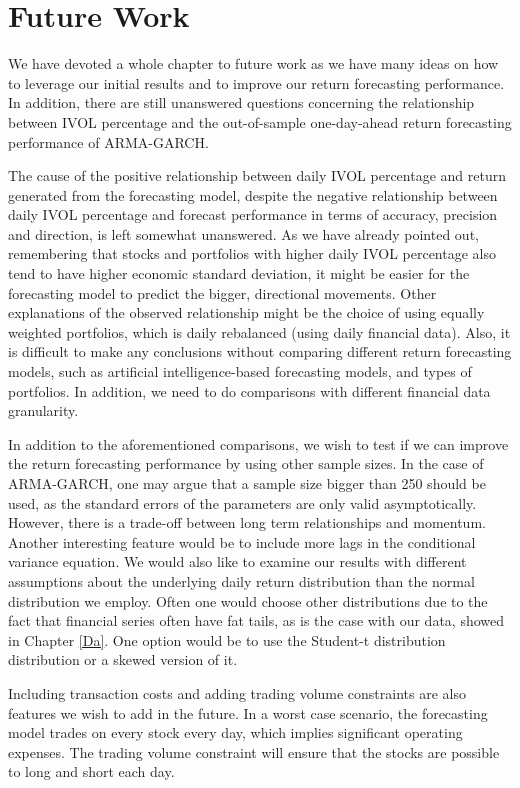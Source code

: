 \chapter{Future Work} \label{FutureWork}
\label{FW}
We have devoted a whole chapter to future work as we have many ideas on how to leverage our initial results and to improve our return forecasting performance. In addition, there are still unanswered questions concerning the relationship between IVOL percentage and the out-of-sample one-day-ahead return forecasting performance of ARMA-GARCH.

The cause of the positive relationship between daily IVOL percentage and return generated from the forecasting model, despite the negative relationship between daily IVOL percentage and forecast performance in terms of accuracy, precision and direction, is left somewhat unanswered. As we have already pointed out, remembering that stocks and portfolios with higher daily IVOL percentage also tend to have higher economic standard deviation, it might be easier for the forecasting model to predict the bigger, directional movements. Other explanations of the observed relationship might be the choice of using equally weighted portfolios, which is daily rebalanced (using daily financial data). Also, it is difficult to make any conclusions without comparing different return forecasting models, such as artificial intelligence-based forecasting models, and types of portfolios. In addition, we need to do comparisons with different financial data granularity.

In addition to the aforementioned comparisons, we wish to test if we can improve the return forecasting performance by using other sample sizes. In the case of ARMA-GARCH, one may argue that a sample size bigger than 250 should be used, as the standard errors of the parameters are only valid asymptotically. However, there is a trade-off between long term relationships and momentum. Another interesting feature would be to include more lags in the conditional variance equation. We would also like to examine our results with different assumptions about the underlying daily return distribution than the normal distribution we employ. Often one would choose other distributions due to the fact that financial series often have fat tails, as is the case with our data, showed in Chapter \ref{Da}. One option would be to use the Student-t distribution distribution or a skewed version of it.


Including transaction costs and adding trading volume constraints are also features we wish to add in the future. In a worst case scenario, the forecasting model trades on every stock every day, which implies significant operating expenses. The trading volume constraint will ensure that the stocks are possible to long and short each day. 

